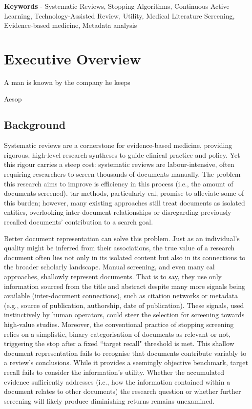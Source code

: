 \documentclass[10pt,oneside]{book}
\begin{document}
    \textbf{Keywords} -  Systematic Reviews, Stopping Algorithms, Continuous Active Learning, Technology-Assisted Review, Utility, Medical Literature Screening, Evidence-based medicine, Metadata analysis
\newpage
\begingroup %
\small %
\vspace*{-3cm}
\tableofcontents

\endgroup
\newpage
\newcommand{\lightshadowbox}[1]{%
  \setlength{\fboxsep}{6pt}%
  \setlength{\shadowsize}{1pt}%
  \shadowbox{#1}%
}


\newpage
\chapter{Executive Overview}

\epigraph{A man is known by the company he keeps}{Aesop}

\section{Background}
Systematic reviews are a cornerstone for evidence-based medicine, providing rigorous, high-level research syntheses to guide clinical practice and policy. Yet this rigour carries a steep cost: systematic reviews are labour-intensive, often requiring researchers to screen thousands of documents manually. The problem this research aims to improve is efficiency in this process (i.e., the amount of documents screened). \gls*{tar} methods, particularly \gls*{cal}, promise to alleviate some of this burden; however, many existing approaches still treat documents as isolated entities, overlooking inter-document relationships or disregarding previously recalled documents' contribution to a search goal.

Better document representation can solve this problem. Just as an individual's quality might be inferred from their associations, the true value of a research document often lies not only in its isolated content but also in its connections to the broader scholarly landscape. Manual screening, and even many \gls*{cal} approaches, shallowly represent documents. That is to say, they use only information sourced from the title and abstract despite many more signals being available (inter-document connections), such as citation networks or metadata (e.g., source of publication, authorship, date of publication). These signals, used instinctively by human operators, could steer the selection for screening towards high-value studies. Moreover, the conventional practice of stopping screening relies on a simplistic, binary categorisation of documents as relevant or not, triggering the stop after a fixed ``target recall" threshold is met. This shallow document representation fails to recognise that documents contribute variably to a review's conclusions. While it provides a seemingly objective benchmark, target recall fails to consider the information's utility. Whether the accumulated evidence sufficiently addresses (i.e., how the information contained within a document relates to other documents) the research question or whether further screening will likely produce diminishing returns remains unexamined. 
\end{document}
